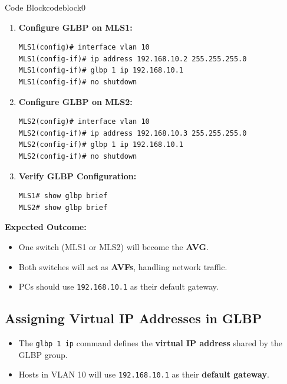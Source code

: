 \documentclass[a4paper]{book}
\begin{document}
\begin{ocg}{Code Block}{codeblock}{0}

\vspace{0.5cm}

\begin{enumerate}
\item \textbf{Configure GLBP on MLS1:}
\begin{lstlisting}
MLS1(config)# interface vlan 10
MLS1(config-if)# ip address 192.168.10.2 255.255.255.0
MLS1(config-if)# glbp 1 ip 192.168.10.1
MLS1(config-if)# no shutdown
\end{lstlisting}

\item \textbf{Configure GLBP on MLS2:}
\begin{lstlisting}
MLS2(config)# interface vlan 10
MLS2(config-if)# ip address 192.168.10.3 255.255.255.0
MLS2(config-if)# glbp 1 ip 192.168.10.1
MLS2(config-if)# no shutdown
\end{lstlisting}

\item \textbf{Verify GLBP Configuration:}
\begin{lstlisting}
MLS1# show glbp brief
MLS2# show glbp brief
\end{lstlisting}
\end{enumerate}
\end{ocg}


\textbf{Expected Outcome:}
\begin{itemize}
\item One switch (MLS1 or MLS2) will become the \textbf{AVG}.
\item Both switches will act as \textbf{AVFs}, handling network traffic.
\item PCs should use \texttt{192.168.10.1} as their default gateway.
\end{itemize}

\subsection{Assigning Virtual IP Addresses in GLBP}
\begin{itemize}
\item The \texttt{glbp 1 ip} command defines the \textbf{virtual IP address} shared by the GLBP group.
\item Hosts in VLAN 10 will use \texttt{192.168.10.1} as their \textbf{default gateway}.
\end{itemize}
\end{document}

